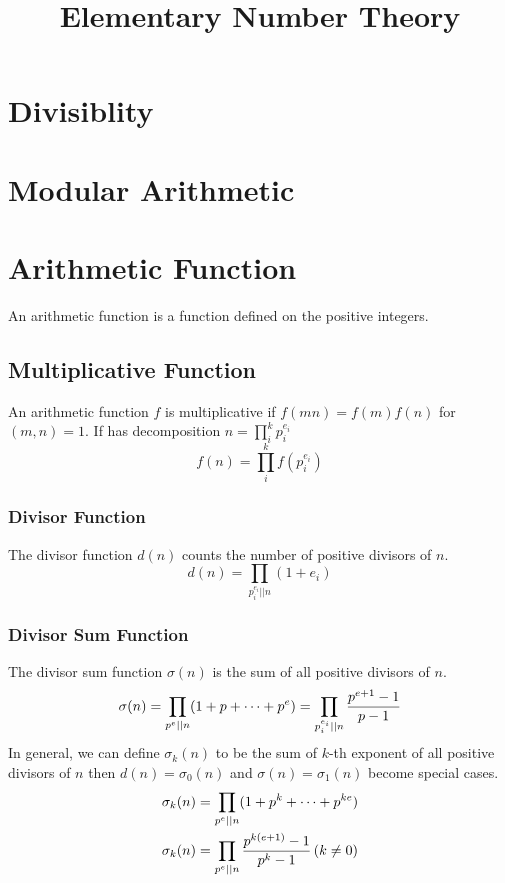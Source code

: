 \documentclass{article}
\title{Elementary Number Theory}
\begin{document}
\maketitle
\newpage
\tableofcontents
\newpage

\section{Divisiblity}

\section{Modular Arithmetic}

\section{Arithmetic Function}
An arithmetic function is a function defined on the positive integers.

\subsection{Multiplicative Function}
An arithmetic function $f$ is multiplicative if $f(mn) = f(m)f(n)$ for $(m, n) = 1$.
If has decomposition $n = \prod_i^k p_i^{e_i}$
$$f(n) = \prod_i^k f(p_i^{e_i})$$

\subsubsection*{Divisor Function}
The divisor function $d(n)$ counts the number of positive divisors of $n$.
$$d(n) = \prod_{p_i^{e_i} \vert\vert n} (1 + e_i)$$

\subsubsection*{Divisor Sum Function}
The divisor sum function $\sigma(n)$ is the sum of all positive divisors of $n$.
\begin{equation*}
\sigma(n) = \prod_{{p^e} \vert\vert n} (1 + p + \cdots + p^e)
= \prod_{p_i^{e_i} \vert\vert n} {p^{e + 1} - 1 \over p - 1}
\end{equation*}
In general, we can define $\sigma_k(n)$ to be the sum of $k$-th exponent of all
positive divisors of $n$ then $d(n) = \sigma_0(n)$ and $\sigma(n) = \sigma_1(n)$
become special cases.
\begin{align*}
\sigma_k(n) &= \prod_{p^e \vert\vert n} (1 + p^k + \cdots + p^{ke}) \\
\sigma_k(n) &= \prod_{p^e \vert\vert n} {p^{k(e + 1)} - 1 \over p^k - 1} \, (k \neq 0)
\end{align*}
\end{document}
